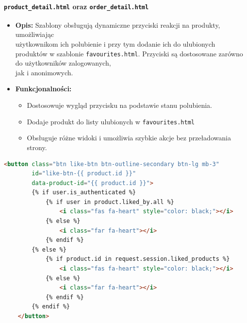\documentclass[12pt,a4paper,oneside]{article}
\theoremstyle{definition}
\numberwithin{equation}{section}
\begin{document}
\paragraph{\texttt{product\_detail.html} oraz \texttt{order\_detail.html}}
\begin{itemize}
    \item \textbf{Opis:}  
    Szablony obsługują dynamiczne przyciski reakcji na produkty, umożliwiając \\użytkownikom ich polubienie
    i przy tym dodanie ich do ulubionych produktów w szablonie \texttt{favourites.html}.
     Przyciski są dostosowane zarówno do użytkowników zalogowanych,\\ jak i anonimowych. 
    \item \textbf{Funkcjonalności:}
    \begin{itemize}
        \item Dostosowuje wygląd przycisku na podstawie stanu polubienia.
        \item Dodaje produkt do listy ulubionych w \texttt{favourites.html} 
        \item Obsługuje różne widoki i umożliwia szybkie akcje bez przeładowania strony.
    \end{itemize}
\end{itemize}

\begin{lstlisting}[language=HTML, caption=Przycisk reakcji]
    <button class="btn like-btn btn-outline-secondary btn-lg mb-3"
        id="like-btn-{{ product.id }}"
        data-product-id="{{ product.id }}">
        {% if user.is_authenticated %}
            {% if user in product.liked_by.all %}
                <i class="fas fa-heart" style="color: black;"></i>
            {% else %}
                <i class="far fa-heart"></i>
            {% endif %}
        {% else %}
            {% if product.id in request.session.liked_products %}
                <i class="fas fa-heart" style="color: black;"></i>
            {% else %}
                <i class="far fa-heart"></i>
            {% endif %}
        {% endif %}
    </button>
    \end{lstlisting}

\clearpage
\end{document}
